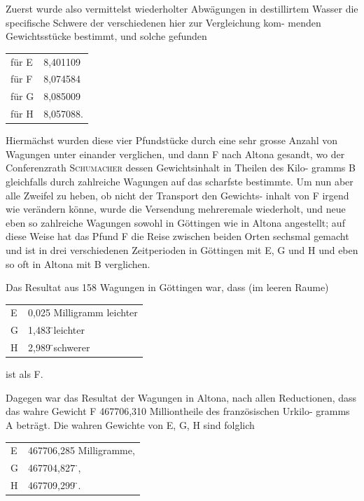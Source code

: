 \documentclass[12pt,a4paper]{article}
\theoremstyle{plain}
\theoremstyle{definition}
\theoremstyle{remark}
\begin{document}
Zuerst wurde also vermittelst wiederholter Abw\"agungen in destillirtem
Wasser die specifische Schwere der verschiedenen hier zur Vergleichung kom-
menden Gewichtsst\"ucke bestimmt, und solche gefunden

\begin{center}
\begin{tabular}{ll}
f\"ur E & 8,401109 \\
f\"ur F & 8,074584 \\
f\"ur G & 8,085009 \\
f\"ur H & 8,057088.
\end{tabular}
\end{center}


Hierm\"achst wurden diese vier Pfundst\"ucke durch eine sehr grosse Anzahl
von Wagungen unter einander verglichen, und dann F nach Altona gesandt,
wo der Conferenzrath \textsc{Schumacher} dessen Gewichtsinhalt in Theilen des Kilo-
gramms B gleichfalls durch zahlreiche Wagungen auf das scharfste bestimmte.
Um nun aber alle Zweifel zu heben, ob nicht der Transport den Gewichts-
inhalt von F irgend wie ver\"andern k\"onne, wurde die Versendung mehreremale
wiederholt, und neue eben so zahlreiche Wagungen sowohl in G\"ottingen wie
in Altona angestellt; auf diese Weise hat das Pfund F die Reise zwischen
beiden Orten sechsmal gemacht und ist in drei verschiedenen Zeitperioden in
G\"ottingen mit E, G und H und eben so oft in Altona mit B verglichen.

Das Resultat aus 158 Wagungen in G\"ottingen war, dass (im leeren Raume)

\begin{center}
\begin{tabular}{l@{ um }l}
E & 0,025 Milligramm leichter \\
G & 1,483 \quad\quad\"\quad\quad leichter \\
H & 2,989 \quad\quad\"\quad\quad schwerer
\end{tabular}
\end{center}
\noindent ist als F.

Dagegen war das Resultat der Wagungen in Altona, nach allen Reductionen,
dass das wahre Gewicht F 467706,310 Milliontheile des franz\"osischen Urkilo-
gramms A betr\"agt. Die wahren Gewichte von E, G, H sind folglich
\begin{center}
\begin{tabular}{l@{ }l}
E & 467706,285 Milligramme, \\
G & 467704,827 \quad\quad\quad\quad\quad\"\quad\quad\quad\quad\quad, \\
H & 467709,299 \quad\quad\quad\quad\quad\"\quad\quad\quad\quad\quad. \\
\end{tabular}
\end{center}
\end{document}
